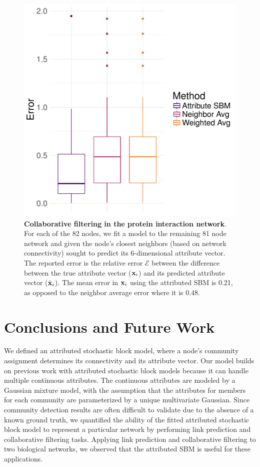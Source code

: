 \begin{figure}[h!]
\begin{center}
\includegraphics[width=1\textwidth]{CollabProtein.pdf}
\caption{{\bf Collaborative filtering in the protein interaction network}. For each of the 82 nodes, we fit a model to the remaining 81 node network and given the node's closest  neighbors (based on network connectivity) sought to predict its 6-dimensional attribute vector. The reported error is the relative error $\mathcal{E}$ between the difference between the true attribute vector (${\bf x}_{i}$) and its predicted attribute vector (${\hat{\bf x}}_{i}$). The mean error in ${\bf x}_{i}$ using the attributed SBM is 0.21, as opposed to the neighbor average error where it is 0.48. }
\label{collabprotein}
\end{center}
\end{figure}

\section{Conclusions and Future Work}
We defined an attributed stochastic block model, where a node's community assignment determines its connectivity and its attribute vector. Our model builds on previous work with attributed stochastic block models because it can handle multiple continuous attributes. The continuous attributes are modeled by a Gaussian mixture model, with the assumption that the attributes for members for each community are parameterized by a unique multivariate Gaussian. Since community detection results are often difficult to validate due to the absence of a known ground truth, we quantified the ability of the fitted attributed stochastic block model to represent a particular network by performing link prediction and collaborative filtering tasks. Applying link prediction and collaborative filtering to two biological networks, we observed that the attributed SBM is useful for these applications.

